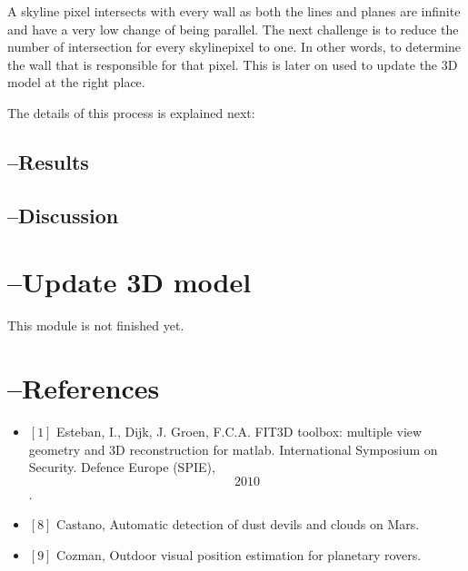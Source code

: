 A skyline pixel intersects with every wall as both the lines and planes are
infinite and have a very low change of being parallel.
The next challenge is to reduce the number of intersection for every skylinepixel
to one. In other words, to determine the wall that is responsible for that pixel. 
This is later on used to update the 3D model at the right place.

The details of this process is explained next:

\subsection{--Results}


\subsection{--Discussion}

\section{--Update 3D model}
This module is not finished yet.


\section{--References}
\begin{itemize}
\item $[1]$ 
Esteban, I., Dijk, J. Groen, F.C.A. FIT3D toolbox: multiple view geometry and
3D reconstruction for matlab. International Symposium on Security. Defence
Europe (SPIE), \[2010\].
\item $[8]$ Castano, Automatic detection of dust devils and clouds on Mars.
\item $[9]$ Cozman, Outdoor visual position estimation for planetary rovers.

\end{itemize}



%

